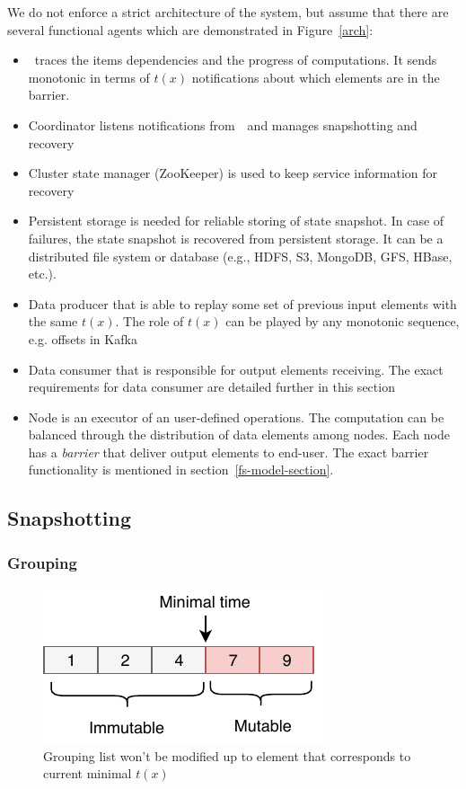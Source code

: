 We do not enforce a strict architecture of the system, but assume that there are several functional agents which are demonstrated in Figure~\ref{arch}:
\begin{itemize}
    \item \Acker\ traces the items dependencies and the progress of computations. It sends monotonic in terms of $t(x)$ notifications about which elements are in the barrier.
    \item Coordinator listens notifications from~\Acker\ and manages snapshotting and recovery
    \item Cluster state manager (ZooKeeper) is used to keep service information for recovery
    \item Persistent storage is needed for reliable storing of state snapshot. In case of failures, the state snapshot is recovered from persistent storage. It can be a distributed file system or database (e.g., HDFS, S3, MongoDB, GFS, HBase, etc.).
    \item Data producer that is able to replay some set of previous input elements with the same $t(x)$. The role of $t(x)$ can be played by any monotonic sequence, e.g. offsets in Kafka
    \item Data consumer that is responsible for output elements receiving. The exact requirements for data consumer are detailed further in this section
    \item Node is an executor of an user-defined operations. The computation can be balanced through the distribution of data elements among nodes. Each node has a {\em barrier} that deliver output elements to end-user. The exact barrier functionality is mentioned in section~\ref{fs-model-section}.
\end{itemize}

\subsection{Snapshotting}

\subsubsection{Grouping}

\begin{figure}[tbp]
  \centering
  \includegraphics[width=0.5\columnwidth]{pics/immutable}
  \caption{Grouping list won't be modified up to element that corresponds to current minimal $t(x)$}	
  \label {immutable}	
\end{figure}

